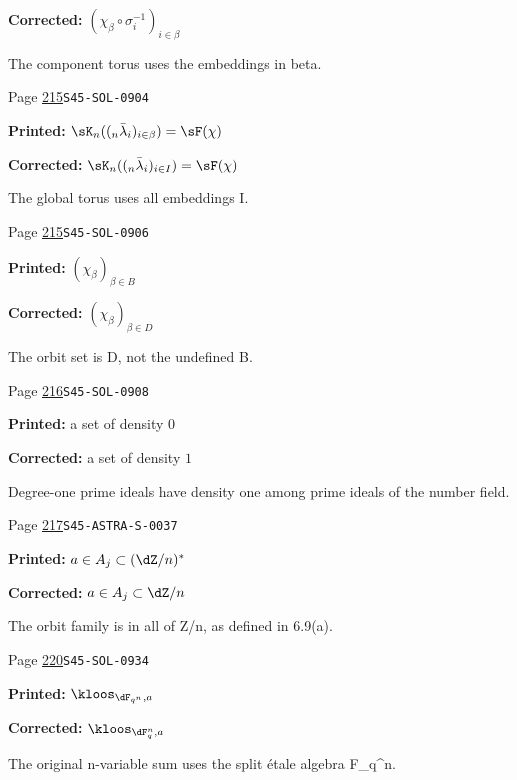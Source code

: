 \begin{description}
\par\noindent\textbf{Corrected:} \((\chi_\beta\circ \sigma_i^{-1})_{i\in\beta}\)
\par\noindent The component torus uses the embeddings in beta.
\smallskip
\item[\hypertarget{apparatus:EN-0157}{157}] Page \hyperlink{printpage:en:215}{215}\quad\texttt{S45-SOL-0904}
\par\noindent\textbf{Printed:} \(\sK_n((_n\bar\lambda_i)_{i\in \beta}) = \sF(\chi)\)
\par\noindent\textbf{Corrected:} \(\sK_n((_n\bar\lambda_i)_{i\in I}) = \sF(\chi)\)
\par\noindent The global torus uses all embeddings I.
\smallskip
\item[\hypertarget{apparatus:EN-0158}{158}] Page \hyperlink{printpage:en:215}{215}\quad\texttt{S45-SOL-0906}
\par\noindent\textbf{Printed:} \((\chi_\beta)_{\beta\in B}\)
\par\noindent\textbf{Corrected:} \((\chi_\beta)_{\beta\in D}\)
\par\noindent The orbit set is D, not the undefined B.
\smallskip
\item[\hypertarget{apparatus:EN-0159}{159}] Page \hyperlink{printpage:en:216}{216}\quad\texttt{S45-SOL-0908}
\par\noindent\textbf{Printed:} a set of density $0$
\par\noindent\textbf{Corrected:} a set of density $1$
\par\noindent Degree-one prime ideals have density one among prime ideals of the number field.
\smallskip
\item[\hypertarget{apparatus:EN-0160}{160}] Page \hyperlink{printpage:en:217}{217}\quad\texttt{S45-ASTRA-S-0037}
\par\noindent\textbf{Printed:} $a\in A_j\subset (\dZ/n)^\ast$
\par\noindent\textbf{Corrected:} $a\in A_j\subset\dZ/n$
\par\noindent The orbit family is in all of Z/n, as defined in 6.9(a).
\smallskip
\item[\hypertarget{apparatus:EN-0161}{161}] Page \hyperlink{printpage:en:220}{220}\quad\texttt{S45-SOL-0934}
\par\noindent\textbf{Printed:} \(\kloos_{\dF_{q^n},a}\)
\par\noindent\textbf{Corrected:} \(\kloos_{\dF_q^n,a}\)
\par\noindent The original n-variable sum uses the split étale algebra F\_q\textasciicircum{}n.

\end{description}

